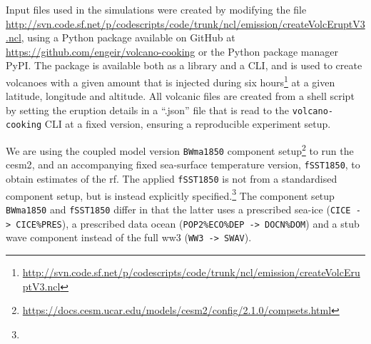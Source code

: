 \documentclass{ametsocV6.1}
\begin{document}





%



\appendix

\appendix[A]


Input files used in the simulations were created by modifying the file
\url{http://svn.code.sf.net/p/codescripts/code/trunk/ncl/emission/createVolcEruptV3.ncl},
using a Python package available on GitHub at
\url{https://github.com/engeir/volcano-cooking} or the Python package manager PyPI\@.
The package is available both as a library and a CLI, and is used to create volcanoes
with a given  amount that is injected during six
hours\footnote{\url{http://svn.code.sf.net/p/codescripts/code/trunk/ncl/emission/createVolcEruptV3.ncl}}
at a given latitude, longitude and altitude. All volcanic  files are created
from a shell script by setting the eruption details in a ``.json'' file that is read to
the \texttt{volcano-cooking} CLI at a fixed version, ensuring a reproducible experiment
setup.

We are using the coupled model version \texttt{BWma1850} component
setup\footnote{\url{https://docs.cesm.ucar.edu/models/cesm2/config/2.1.0/compsets.html}}
to run the \gls{cesm2}, and an accompanying fixed sea-surface temperature version,
\texttt{fSST1850}, to obtain estimates of the \gls{rf}. The applied \texttt{fSST1850} is
not from a standardised component setup, but is instead explicitly
specified.\footnote{\fssturl} The component setup \texttt{BWma1850} and
\texttt{fSST1850} differ in that the latter uses a prescribed sea-ice (\texttt{CICE ->
CICE\%PRES}), a prescribed data ocean (\texttt{POP2\%ECO\%DEP -> DOCN\%DOM}) and a stub
wave component instead of the full \gls{ww3} (\texttt{WW3 -> SWAV}).
\end{document}
